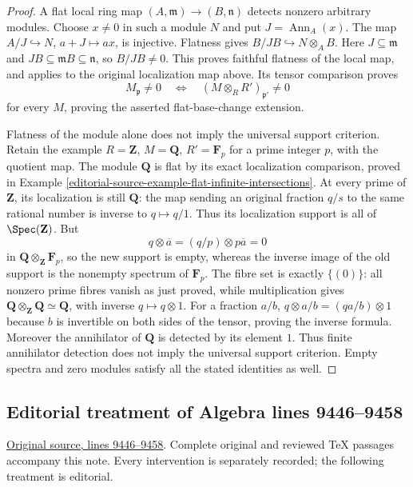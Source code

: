 \begin{proof}
A flat local ring map $(A,\mathfrak m)\to(B,\mathfrak n)$
detects nonzero arbitrary modules. Choose $x\ne0$ in such
a module $N$ and put $J=\operatorname{Ann}_A(x)$.
The map $A/J\hookrightarrow N$, $a+J\mapsto ax$, is
injective. Flatness gives $B/JB\hookrightarrow N\otimes_AB$.
Here $J\subseteq\mathfrak m$ and
$JB\subseteq\mathfrak mB\subseteq\mathfrak n$, so
$B/JB\ne0$. This proves faithful flatness of the local
map, and applies to the original localization map above.
Its tensor comparison proves
$$
M_{\mathfrak p}\ne0
\quad\Longleftrightarrow\quad
(M\otimes_RR')_{\mathfrak p'}\ne0
$$
for every $M$, proving the asserted flat-base-change extension.

Flatness of the module alone does not imply the universal
support criterion. Retain the example
$R=\mathbf Z$, $M=\mathbf Q$, $R'=\mathbf F_p$ for a
prime integer $p$, with the quotient map. The module
$\mathbf Q$ is flat by its exact localization comparison,
proved in Example \ref{editorial-source-example-flat-infinite-intersections}.
At every prime of $\mathbf Z$, its localization is still
$\mathbf Q$: the map sending an original fraction $q/s$
to the same rational number is inverse to $q\mapsto q/1$.
Thus its localization support is all of $\Spec(\mathbf Z)$.
But
$$
q\otimes\overline a=(q/p)\otimes p\overline a=0
$$
in $\mathbf Q\otimes_{\mathbf Z}\mathbf F_p$, so the
new support is empty, whereas the inverse image of the
old support is the nonempty spectrum of $\mathbf F_p$.
The fibre set is exactly $\{(0)\}$: all nonzero prime
fibres vanish as just proved, while multiplication gives
$\mathbf Q\otimes_{\mathbf Z}\mathbf Q\simeq\mathbf Q$,
with inverse $q\mapsto q\otimes1$. For a fraction $a/b$,
$q\otimes a/b=(qa/b)\otimes1$ because $b$ is invertible
on both sides of the tensor, proving the inverse formula.
Moreover the annihilator of $\mathbf Q$ is detected by
its element $1$. Thus finite annihilator detection does
not imply the universal support criterion. Empty spectra
and zero modules satisfy all the stated identities as well.
\end{proof}


\subsection{Editorial treatment of Algebra lines 9446--9458}

\hypertarget{algebra-context-102}{}

\noindent\href{https://github.com/stacks/stacks-project/blob/a04446e57ec1fbc252a871afcec7752fb2807b14/algebra.tex\#L9446}{Original source, lines 9446--9458}. Complete original and reviewed TeX passages accompany this note. Every intervention is separately recorded; the following treatment is editorial.


